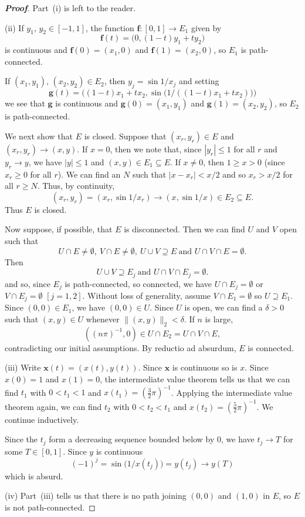 \begin{proof}[\bf Proof] Part~(i) is left to the reader.

(ii) If $y_{1},\,y_{2}\in[-1,1]$, the function
${\mathbf f}:[0,1]\rightarrow E_{1}$ given by
\[{\mathbf f}(t)=\big(0,(1-t)y_{1}+ty_{2}\big)\]
is continuous and ${\mathbf f}(0)=(x_{1},0)$ and 
${\mathbf f}(1)=(x_{2},0)$,
so $E_{1}$ is path-connected.

If $(x_{1},y_{1}),\,(x_{2},y_{2})\in E_{2}$,
then $y_{j}=\sin 1/x_{j}$ and setting
\[{\mathbf g}(t)=
\biggr((1-t)x_{1}+tx_{2},\sin\big(1/((1-t)x_{1}+tx_{2})\big)\biggr)
\]
we see that ${\mathbf g}$ is continuous and 
${\mathbf g}(0)=(x_{1},y_{1})$ and 
${\mathbf g}(1)=(x_{2},y_{2})$,
so $E_{2}$ is path-connected.

We next show that $E$ is closed. 
Suppose that $(x_{r},y_{r})\in E$
and $(x_{r},y_{r})\rightarrow (x,y)$. If $x=0$, then
we note that, since $|y_{r}|\leq 1$ for all $r$ and
$y_{r}\rightarrow y$, we have $|y|\leq 1$ and 
$(x,y)\in E_{1}\subseteq E$. If $x\neq 0$, then
$1\geq x>0$ (since $x_{r}\geq 0$ for all $r$). We can find an $N$
such that $|x-x_{r}|<x/2$ and so $x_{r}>x/2$ for all $r\geq N$.
Thus, by continuity,
\[(x_{r},y_{r})=(x_{r},\sin 1/x_{r})\rightarrow (x,\sin 1/x)
\in E_{2}\subseteq E.\]
Thus $E$ is closed.

Now suppose, if possible, that $E$ is disconnected.
Then we can find $U$ and $V$ open such that 
\[U\cap E\neq\emptyset,\ V\cap E\neq\emptyset,\ U\cup V\supseteq E
\ \text{and $U\cap V\cap E=\emptyset$}.\]
Then  
\[U\cup V\supseteq E_{j}
\ \text{and $U\cap V\cap E_{j}=\emptyset$}.\]
and so, since $E_{j}$ is path-connected, so connected,
we have $U\cap E_{j}=\emptyset$ or $V\cap E_{j}=\emptyset$
$[j=1,2]$. Without loss of generality, assume $V\cap E_{1}=\emptyset$
so $U\supseteq E_{1}$. Since $(0,0)\in E_{1}$, we have
$(0,0)\in U$. Since $U$ is open, we can find a $\delta>0$
such that $(x,y)\in U$ whenever $\|(x,y)\|_{2}<\delta$.
If $n$ is large, 
\[((n\pi)^{-1},0)\in U\cap E_{2}=U\cap V\cap E,\]
contradicting our initial assumptions.
By reductio ad absurdum, $E$ is connected.

(iii) Write ${\mathbf x}(t)=(x(t),y(t))$. Since ${\mathbf x}$
is continuous so is $x$. Since $x(0)=1$ and $x(1)=0$,
the intermediate value theorem tells us that we can find
$t_{1}$ with $0<t_{1}<1$ and $x(t_{1})=(\tfrac{3}{2}\pi)^{-1}$.
Applying the  intermediate value theorem again, we can
find $t_{2}$ with $0<t_{2}<t_{1}$ and 
$x(t_{2})=(\tfrac{5}{2}\pi)^{-1}$. We continue inductively.

Since the $t_{j}$ form a decreasing sequence bounded below
by $0$, we have $t_{j}\rightarrow T$ for some $T\in[0,1]$.
Since $y$ is continuous 
\[(-1)^{j}=\sin\big(1/x(t_{j})\big)=y(t_{j})\rightarrow y(T)\]
which is absurd.

(iv) Part~(iii) tells us that there is no path joining
$(0,0)$ and $(1,0)$ in $E$, so $E$ is not path-connected.
\end{proof} 


